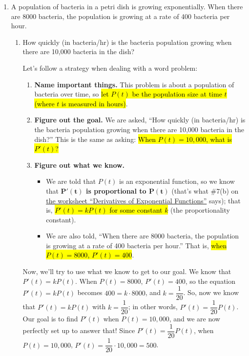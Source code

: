 \documentclass{article}
\begin{document}
\begin{enumerate}[resume]
\item 


  A population of bacteria in a petri dish is growing exponentially. When there are 8000 bacteria, the population is growing at a rate of 400 bacteria per hour.

  \begin{enumerate}
  \item
    \begin{problem}[1.5in]
       How quickly (in bacteria/hr) is the bacteria population growing when there are 10,000 bacteria in the dish?
    \end{problem}

    \begin{solution}
      Let's follow a strategy when dealing with a word problem:
      \begin{enumerate}[label=\arabic*.]
      \item \textbf{Name important things.} This problem is about a population of bacteria over time, so \hl{let $P(t)$ be the population size at time $t$ (where $t$ is measured in hours)}.
      \item \textbf{Figure out the goal.} We are asked, ``How quickly (in bacteria/hr) is the bacteria population growing when there are 10,000 bacteria in the dish?'' This is the same as asking: \hl{When $P(t) = 10,000$, what is $P'(t)$?}
      \item \textbf{Figure out what we know.}
        \begin{itemize}
        \item We are told that $P(t)$ is an exponential function, so we know that \textbf{$\bm{P'(t)}$ is proportional to $\bm{P(t)}$} (that's what {{{{\#7}}(b)}} on \href{https://people.math.harvard.edu/~jjchen/mathma/docs/worksheets/worksheet24-sols.html}{the worksheet ``Derivatives of Exponential Functions''} says); that is, \hl{$P'(t) = k P(t)$ for some constant $k$} (the proportionality constant).
        \item We are also told, ``When there are 8000 bacteria, the population is growing at a rate of 400 bacteria per hour.'' That is, \hl{when $P(t) = 8000$, $P'(t) = 400$}.
        \end{itemize}
      \end{enumerate}
      Now, we'll try to use what we know to get to our goal. We know that $P'(t) = k P(t)$. When $P(t) = 8000$, $P'(t) = 400$, so the equation $P'(t) = k P(t)$ becomes $400 = k \cdot 8000$, and $k = \dfrac{1}{20}$. So, now we know that $P'(t) = k P(t)$ with $k = \dfrac{1}{20}$; in other words, $P'(t) = \dfrac{1}{20} P(t)$. Our goal is to find $P'(t)$ when $P(t) = 10,000$, and we are now perfectly set up to answer that! Since $P'(t) = \dfrac{1}{20} P(t)$, when $P(t) = 10,000$, $P'(t) = \dfrac{1}{20} \cdot 10,000 = \boxed{500}$.
    \end{solution}


\end{enumerate}
\end{enumerate}
\end{document}
